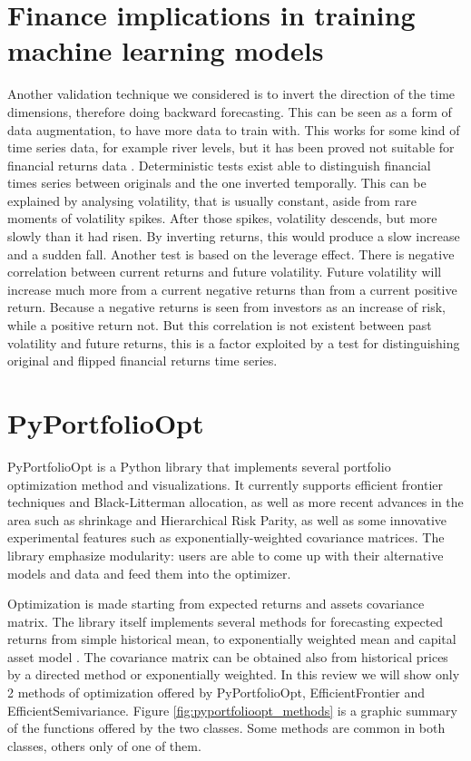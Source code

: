 \section*{Finance implications in training machine learning models}
Another validation technique we considered is to invert the direction of the time dimensions, therefore doing backward forecasting. This can be seen as a form of data augmentation, to have more data to train with. This works for some kind of time series data, for example river levels, but it has been proved not suitable for financial returns data \cite{FLANAGAN20161689} \cite{ramsey1996time}. 
Deterministic tests exist able to distinguish financial times series between originals and the one inverted temporally.  
This can be explained by analysing volatility, that is usually constant, aside from rare moments of volatility spikes. After those spikes, volatility descends, but more slowly than it had risen. By inverting returns, this would produce a slow increase and a sudden fall. 
Another test is based on the leverage effect. There is negative correlation between current returns and future volatility. Future volatility will increase much more from a current negative returns than from a current positive return. Because a negative returns is seen from investors as an increase of risk, while a positive return not. 
But this correlation is not existent between past volatility and future returns, this is a factor exploited by a test for distinguishing original and flipped financial returns time series. 

\section*{PyPortfolioOpt}

PyPortfolioOpt is a Python library that implements several portfolio optimization method and visualizations. It currently supports efficient frontier techniques and Black-Litterman allocation, as well as more recent advances in the area such as shrinkage and Hierarchical Risk Parity, as well as some innovative experimental features such as exponentially-weighted covariance matrices\cite{Martin2021}. 
The library emphasize modularity: users are able to come up with their alternative models and data and feed them into the optimizer.

\hfill \break

Optimization is made starting from expected returns and assets covariance matrix. The library itself implements several methods for forecasting expected returns from simple historical mean, to exponentially weighted mean and capital asset model \cite{investmentscience}. 
The covariance matrix can be obtained also from historical prices by a directed method or exponentially weighted.
In this review we will show only 2 methods of optimization offered by PyPortfolioOpt, EfficientFrontier and EfficientSemivariance. Figure \ref{fig:pyportfolioopt_methods} 
is a graphic summary of the functions offered by the two classes. Some methods are common in both classes, others only of one of them.

